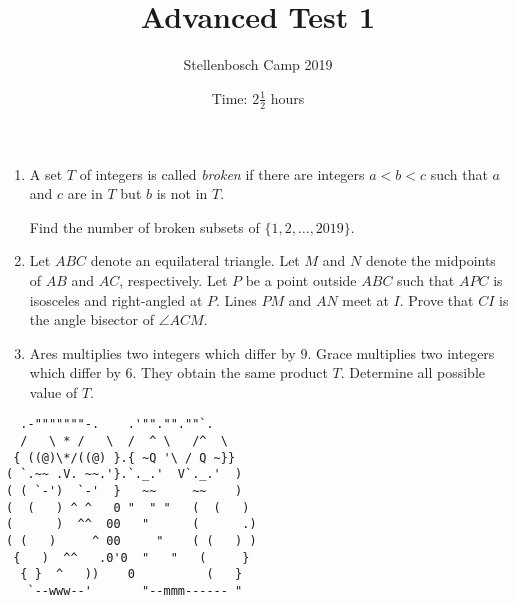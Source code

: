 \documentclass{article}
\title{Advanced Test 1}
\author{Stellenbosch Camp 2019}
\date{Time: $2\frac{1}{2}$ hours}
\begin{document}
\maketitle
\thispagestyle{empty}


\begin{enumerate}[1.]

\item %
A set $T$ of integers is called \emph{broken} if there are integers $a < b < c$ such that $a$ and $c$ are in $T$ but $b$ is not in $T$.

Find the number of broken subsets of $\{1, 2, \dotsc, 2019\}$.


\item %
Let $ABC$ denote an equilateral triangle.
Let $M$ and $N$ denote the midpoints of $AB$ and $AC$, respectively.
Let $P$ be a point outside $ABC$ such that $APC$ is isosceles and right-angled at $P$.
Lines $PM$ and $AN$ meet at $I$.
Prove that $CI$ is the angle bisector of $\angle ACM$.


\item %
Ares multiplies two integers which differ by $9$.
Grace multiplies two integers which differ by $6$.
They obtain the same product $T$.
Determine all possible value of $T$.

\end{enumerate}


\vfill
\centering
\begin{BVerbatim}
  .-"""""""-.    .'""."".""`.
  /   \ * /   \  /  ^ \   /^  \
 { ((@)\*/((@) }.{ ~Q '\ / Q ~}}
( `.~~ .V. ~~.'}.`._.'  V`._.'  )
( ( `-')  `-'  }   ~~     ~~    )
(  (   ) ^ ^   0 "  " "   (  (   )
(      )  ^^  00   "      (      .)
( (   )     ^ 00     "    ( (   ) )
 {   )  ^^   .0'0  "   "   (     }
  { }  ^   ))    0          (   }
   `--www--'       "--mmm------ "    
\end{BVerbatim}
\end{document}
